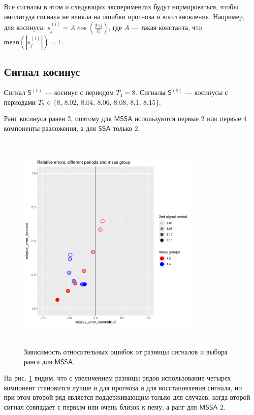 \documentclass[specialist, substylefile = spbureport.rtx,
    subf,href,colorlinks=true, 12pt]{disser}
\newcommand{\sfS}{\mathsf{S}}
\newcommand{\SSA}{\mathsf{SSA}}
\newcommand{\MSSA}{\mathsf{MSSA}}
\newcommand{\mean}{\mathsf{mean}}
\begin{document}
        Все сигналы в этом и следующих экспериментах будут нормироваться, чтобы амплитуда сигнала не влияла на ошибки прогноза и восстановления. Например, для косинуса: $s_j^{(i)} = A \cos(\frac{2\pi j}{T_i})$, где $A$ --- такая константа, что $\mean(|s_j^{(i)}|) = 1$.


    \subsection{Сигнал косинус}
        Сигнал $\sfS^{(1)}$ --- косинус с периодом $T_1 = 8$.
        Сигналы $\sfS^{(2)}$ --- косинусы с периодами $T_2 \in \{8$, $8.02$, $8.04$, $8.06$, $8.08$, $8.1$, $8.15\}$.

        Ранг косинуса равен 2, поэтому для $\MSSA$ используются первые 2 или первые 4 компоненты разложения, а для $\SSA$ только 2.

        \begin{figure}[h]
            \centering
            \includegraphics[height=11cm, width=0.8\textwidth]{experiment_1_cos.pdf}
            \caption{Зависимость относительных ошибок от разницы сигналов и выбора ранга для $\MSSA$.}
            \label{fig:exp1_cos}
        \end{figure}

        На рис. \ref{fig:exp1_cos} видим, что с увеличением разницы рядов использование четырех компонент становится лучше и для прогноза и для восстановления сигнала, но при этом второй ряд является поддерживающим только для случаев, когда второй сигнал совпадает с первым или очень близок к нему, а ранг для $\MSSA$ 2.
\end{document}
